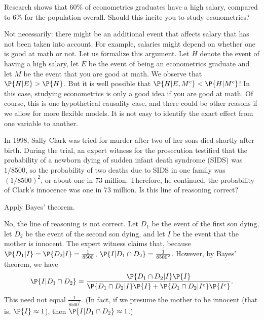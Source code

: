 	\begin{exercise}
		Research shows that 60\% of econometrics graduates have a high salary, compared to 6\% for the population overall. Should this incite you to study econometrics?
		\begin{solution}
			Not necessarily: there might be an additional event that affects salary that has not been taken into account. For example, salaries might depend on whether one is good at math or not. Let us formalize this argument. Let $H$ denote the event of having a high salary, let $E$ be the event of being an econometrics graduate and let $M$ be the event that you are good at math. We observe that $\P{H | E} > \P{H}$. But it is well possible that $\P{H | E, M^c} < \P{H | M^c}$! In this case, studying econometrics is only a good idea if you are good at math. Of course, this is one hypothetical causality case, and there could be other reasons if we allow for more flexible models. It is not easy to identify the exact effect from one variable to another.
		\end{solution}
	\end{exercise}
	
	\begin{exercise}
		In 1998, Sally Clark was tried for murder after two of her sons died shortly after birth. During the trial, an expert witness for the prosecution testified that the probability of a newborn dying of sudden infant death syndrome (SIDS) was $1 / 8500$, so the probability of two deaths due to SIDS in one family was $(1 / 8500)^2$, or about one in 73 million. Therefore, he continued, the probability of Clark's innocence was one in 73 million. Is this line of reasoning correct?
		\begin{hint}
			Apply Bayes' theorem.
		\end{hint}
		\begin{solution}
			No, the line of reasoning is not correct. Let $D_1$ be the event of the first son dying, let $D_2$ be the event of the second son dying, and let $I$ be the event that the mother is innocent. The expert witness claims that, because $\P{D_1 | I} = \P{D_2 | I} = \frac{1}{8500}$, $\P{I | D_1 \cap D_2} = \frac{1}{8500^2}$. However, by Bayes' theorem, we have
			\begin{equation*}
				\P{I | D_1 \cap D_2} = \frac{\P{D_1 \cap D_2 | I} \P{I}}{\P{D_1 \cap D_2 | I} \P{I} + \P{D_1 \cap D_2 | I^c} \P{I^c}}.
			\end{equation*}
			This need not equal $\frac{1}{8500^2}$. (In fact, if we presume the mother to be innocent (that is, $\P{I} \approx 1$), then $\P{I | D_1 \cap D_2} \approx 1$.)
		\end{solution}
	\end{exercise}
	
